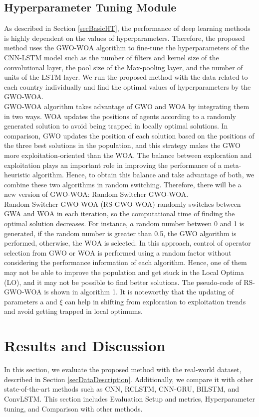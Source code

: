 \documentclass{article}
\begin{document}
\subsection{Hyperparameter Tuning Module}\label{secProHTM}
As described in Section \ref{secBasicHT}, the performance of deep learning methods is highly dependent on the values of hyperparameters. Therefore, the proposed method uses the GWO-WOA algorithm to fine-tune the hyperparameters of the CNN-LSTM model such as the number of filters and kernel size of the convolutional layer, the pool size of the Max-pooling layer, and the number of units of the LSTM layer. We run the proposed method with the data related to each country individually and find the optimal values of hyperparameters by the GWO-WOA.\\
GWO-WOA algorithm takes advantage of GWO and WOA by integrating them in two ways. WOA updates the positions of agents according to a randomly generated solution to avoid being trapped in locally optimal solutions. In comparison, GWO updates the position of each solution based on the positions of the three best solutions in the population, and this strategy makes the GWO more exploitation-oriented than the WOA. The balance between exploration and exploitation plays an important role in improving the performance of a meta-heuristic algorithm. Hence, to obtain this balance and take advantage of both, we combine these two algorithms in random switching. Therefore, there will be a new version of GWO-WOA:  Random Switcher GWO-WOA.\\ 
Random Switcher GWO-WOA (RS-GWO-WOA) randomly switches between GWA and WOA in each iteration, so the computational time of finding the optimal solution decreases. For instance, $a$ random number between 0 and 1 is generated, if the random number is greater than 0.5, the GWO algorithm is performed, otherwise, the WOA is selected. In this approach, control of operator selection from GWO or WOA is performed using a random factor without considering the performance information of each algorithm. Hence, one of them may not be able to improve the population and get stuck in the Local Optima (LO), and it may not be possible to find better solutions. The pseudo-code of RS-GWO-WOA is shown in algorithm 1. It is noteworthy that the updating of parameters a and $\xi$ can help in shifting from exploration to exploitation trends and avoid getting trapped in local optimums. 

\section{Results and Discussion}\label{secResults}
In this section, we evaluate the proposed method with the real-world dataset, described in Section \ref{secDataDescription}. Additionally, we compare it with other state-of-the-art methods such as CNN, RCLSTM, CNN-GRU, BILSTM, and ConvLSTM. This section includes Evaluation Setup and metrics, Hyperparameter tuning, and Comparison with other methods. 
\end{document}
